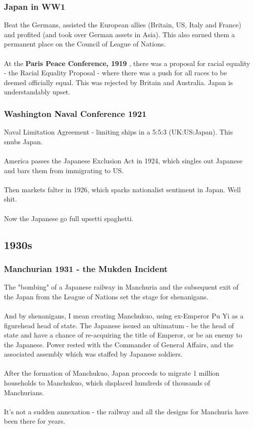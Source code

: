 \documentclass[a4paper]{article}
\begin{document}
\subsubsection{Japan in WW1}
Beat the Germans, assisted the European allies (Britain, US, Italy and France) and profited (and took over German assets in Asia). This also earned them a permanent place on the Council of League of Nations.\\
\\
At the \textbf{Paris Peace Conference, 1919} , there was a proposal for racial equality - the Racial Equality Proposal - where there was a push for all races to be deemed officially equal. This was rejected by Britain and Australia. Japan is understandably upset.
\subsubsection{Washington Naval Conference 1921}
Naval Limitation Agreement - limiting ships in a 5:5:3 (UK:US:Japan). This snubs Japan.\\
\\
America passes the Japanese Exclusion Act in 1924, which singles out Japanese and bars them from immigrating to US.\\
\\
Then markets falter in 1926, which sparks nationalist sentiment in Japan. Well shit.\\
\\
Now the Japanese go full upsetti spaghetti.
\subsection{1930s}
\subsubsection{Manchurian 1931 - the Mukden Incident}
The "bombing" of a Japanese railway in Manchuria and the subsequent exit of the Japan from the League of Nations set the stage for shenanigans.\\
\\
And by shenanigans, I mean creating Manchukuo, using ex-Emperor Pu Yi as a figurehead head of state. The Japanese issued an ultimatum - be the head of state and have a chance of re-acquiring the title of Emperor, or be an enemy to the Japanese. Power rested with the Commander of General Affairs, and the associated assembly which was staffed by Japanese soldiers.\\
\\
After the formation of Manchukuo, Japan proceeds to migrate 1 million households to Manchukuo, which displaced hundreds of thousands of Manchurians.\\
\\
It's not a sudden annexation - the railway and all the designs for Manchuria have been there for years.
\end{document}
